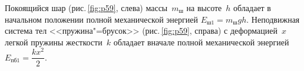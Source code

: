 \documentclass[main.tex]{subfiles}
\begin{document}
Покоящийся шар (рис.\,\ref{fig:p59}, слева) массы~$m_\text{ш}$ на высоте~$h$ обладает в начальном положении полной механической энергией $E_\text{ш1}=m_\text{ш}gh$. Неподвижная система тел <<пружина"=брусок>> (рис.\,\ref{fig:p59}, справа) с деформацией~$x$ легкой пружины жесткости~$k$ обладает вначале полной механической энергией $E_\text{пб1}=\dfrac{kx^2}{2}$.












\end{document}
